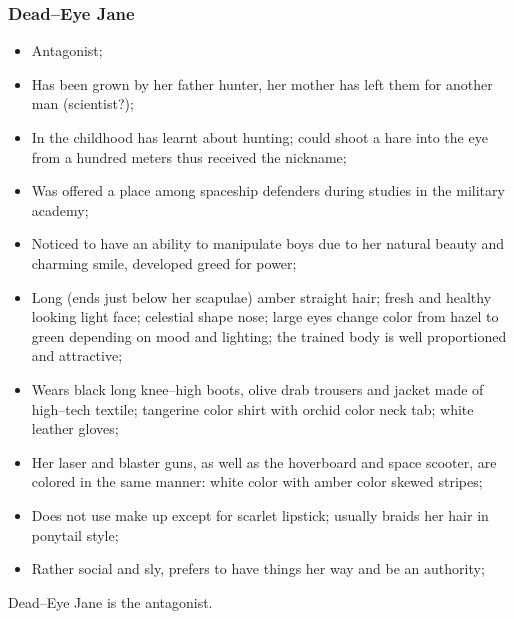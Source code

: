 \documentclass{article}
\begin{document}
\subsubsection*{Dead--Eye Jane}

\begin{itemize}

  \item Antagonist;

  \item Has been grown by her father hunter, her mother has left them for
    another man (scientist?);

  \item In the childhood has learnt about hunting; could shoot a hare into the
    eye from a hundred meters thus received the nickname;

  \item Was offered a place among spaceship defenders during studies in the
    military academy;

  \item Noticed to have an ability to manipulate boys due to her natural beauty
    and charming smile, developed greed for power;

  \item Long (ends just below her scapulae) amber straight hair; fresh and
    healthy looking light face; celestial shape nose; large eyes change color
    from hazel to green depending on mood and lighting; the trained body is well
    proportioned and attractive;

  \item Wears black long knee--high boots, olive drab trousers and jacket made
    of high--tech textile; tangerine color shirt with orchid color neck tab;
    white leather gloves;

  \item Her laser and blaster guns, as well as the hoverboard and space scooter,
    are colored in the same manner: white color with amber color skewed stripes;

  \item Does not use make up except for scarlet lipstick; usually braids her
    hair in ponytail style;

  \item Rather social and sly, prefers to have things her way and be an
    authority;

\end{itemize}

Dead--Eye Jane is the antagonist.
\end{document}
